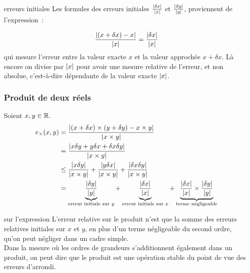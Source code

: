 
\begin{remarque}{}{erreurs initiales}
    Les formules des erreurs initiales $\frac{|\delta x|}{|x|}$ et $\frac{|\delta y|}{|y|}$, proviennent de l'expression~:

    $$\frac{|(x + \delta x) - x|}{|x|} = \frac{|\delta x|}{|x|} $$
    qui mesure l'erreur entre la valeur exacte $x$ et la valeur approchée $x + \delta x$. Là encore on divise par $|x|$ pour avoir une mesure relative de l'erreur, et non absolue, c'est-à-dire dépendante de la valeur exacte $|x|$.
    
\end{remarque}

\subsubsection{Produit de deux réels}
Soient $x,y \in \mathbb{R}$. 
\begin{align*}
e_\times(x,y) &= \frac{|(x+\delta x) \times (y + \delta y) - x \times y|}{|x \times y|}\\
  &= \frac{|x \delta y + y \delta x + \delta x \delta y|}{|x \times y|}\\
  &\le \frac{|x \delta y|}{|x \times y|} + \frac{|y \delta x|}{|x \times y|} + \frac{|\delta x \delta y|}{|x \times y|}\\
  &= \underbrace{\frac{|\delta y|}{|y|}}_{\text{erreur initiale sur $y$}}
     + \underbrace{\frac{|\delta x|}{|x|}}_{\text{erreur initiale sur $x$}}
     + \underbrace{\frac{|\delta x|}{|x|} \times \frac{|\delta y|}{|y|}}_{\text{terme négligeable}}
\end{align*}
\begin{remarque}{}{sur l'expression}
    L'erreur relative sur le produit n'est que la somme des erreurs relatives initiales sur $x$ et $y$, en plus d'un terme négligeable du second ordre, qu'on peut négliger dans un cadre simple.\\
    Dans la mesure où les ordres de grandeurs s'additionnent également dans un produit, on peut dire que le produit est une opération stable du point de vue des erreurs d'arrondi.
\end{remarque}

